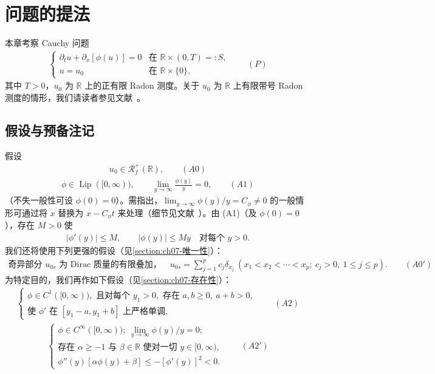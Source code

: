\documentclass[../../main.tex]{subfiles}%
\begin{document}
\section{问题的提法}\label{section:ch07-问题提法}

本章考察 Cauchy 问题
\begin{align*}
\begin{cases}
\partial_t u + \partial_x[\phi(u)] = 0 & \text{在 }\mathbb{R}\times(0,T)=:S,\\
u=u_0 & \text{在 }\mathbb{R}\times\{0\},
\end{cases}
\qquad(P)
\end{align*}
其中 $T>0$，$u_0$ 为 $\mathbb{R}$ 上的正有限 Radon 测度。关于 $u_0$ 为 $\mathbb{R}$ 上有限带号 Radon 测度的情形，我们请读者参见文献~\cite{ref19}。

\subsection{假设与预备注记}\label{subsection:ch07-假设}

假设
\begin{align*}
u_0\in\mathscr{R}_f^+(\mathbb{R}), \qquad(A0)
\end{align*}
\begin{align*}
\phi\in\operatorname{Lip}([0,\infty)),\qquad \lim_{y\to\infty}\frac{\phi(y)}{y}=0, \qquad(A1)
\end{align*}
（不失一般性可设 $\phi(0)=0$）。需指出，$\lim_{y\to\infty}\phi(y)/y=C_\phi\neq0$ 的一般情形可通过将 $x$ 替换为 $x-C_\phi t$ 来处理（细节见文献~\cite{ref18}）。由 (A1)（及 $\phi(0)=0$），存在 $M>0$ 使
\begin{align}
|\phi'(y)|\leqslant M,\qquad |\phi(y)|\leqslant My\quad \text{对每个 }y>0. \label{align:ch07-7.1}
\end{align}
我们还将使用下列更强的假设（见\cref{section:ch07-唯一性}）：
\begin{align*}
\text{奇异部分 }u_{0s}\text{ 为 Dirac 质量的有限叠加，}
\quad u_{0s}=\sum_{j=1}^p c_j\delta_{x_j}\ (x_1<x_2<\cdots<x_p;\ c_j>0,\ 1\leqslant j\leqslant p). \qquad(A0')
\end{align*}
为特定目的，我们再作如下假设（见\cref{section:ch07-存在性}）：
\begin{align*}
\begin{cases}
\phi\in C^1([0,\infty)),\text{ 且对每个 }y_1>0,\text{ 存在 }a,b\geqslant0,\ a+b>0,\\
\text{使 }\phi'\text{ 在 }[y_1-a,y_1+b]\text{ 上严格单调},
\end{cases}
\qquad(A2)
\end{align*}
\begin{align*}
\begin{cases}
\phi\in C^\infty([0,\infty));\ \lim_{y\to\infty}\phi(y)/y=0;\\
\text{存在 }\alpha\geqslant-1\text{ 与 }\beta\in\mathbb{R}\text{ 使对一切 }y\in[0,\infty),\\
\phi''(y)[\alpha\phi(y)+\beta]\leqslant-[\phi'(y)]^2<0.
\end{cases}
\qquad(A2')
\end{align*}
\end{document}
